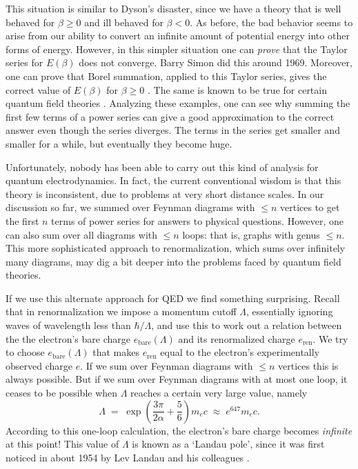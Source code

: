 \documentclass{article}
\newcommand{\bare}{\mathrm{bare}}
\newcommand{\ren}{\mathrm{ren}}
\begin{document}
This situation is similar to Dyson's disaster, since we have a theory that is well behaved for $\beta \ge 0$ and ill behaved for $\beta < 0$.  As before, the bad behavior seems to arise from our ability to convert an infinite amount of potential energy into other forms of energy.    However, in this simpler situation one can \emph{prove} that the Taylor series for $E(\beta)$ does not converge.  Barry Simon \cite{Simon1970} did this around 1969.  Moreover, one can prove that Borel summation, applied to this Taylor series, gives the correct value of $E(\beta)$ for $\beta \ge 0$ \cite{GGS}.  The same is known to be true for certain quantum field theories \cite{Rivasseau}.  Analyzing these examples, one can see why summing the first few terms of a power series can give a good approximation to the correct answer even though the series diverges.   The terms in the series get smaller and smaller for a while, but eventually they become huge.

Unfortunately, nobody has been able to carry out this kind of analysis for quantum electrodynamics.  In fact, the current conventional wisdom is that this theory is inconsistent, due to problems at very short distance scales.   In our discussion so far, we summed over Feynman diagrams with $\le n$ vertices to get the first $n$ terms of power series for answers to physical questions.  However, one can also sum over all diagrams with $\le n$ loops: that is, graphs with genus $\le n$.  This more sophisticated approach to renormalization, which sums over infinitely many diagrams, may dig a bit deeper into the problems faced by quantum field theories.   

If we use this alternate approach for QED we find something surprising.  Recall that
in renormalization we impose a momentum cutoff $\Lambda$, essentially ignoring waves of wavelength less than $\hbar/\Lambda$, and use this to work out a relation between the
the electron's bare charge $e_\bare(\Lambda)$ and its renormalized charge $e_\ren$.
We try to choose $e_\bare(\Lambda)$ that makes $e_\ren$ equal to the electron's experimentally observed charge $e$.   If we sum over Feynman diagrams with $\le n$ vertices this is always possible.  But if we sum over Feynman diagrams with at most one loop, it ceases to be possible when $\Lambda$ reaches a certain very large value, namely
\[     \Lambda \; = \; \exp\left(\frac{3 \pi}{2 \alpha} + \frac{5}{6}\right) m_e c \; \approx \; e^{647} m_e c. \] 
According to this one-loop calculation, the electron's bare charge becomes \emph{infinite} at this point!    This value of $\Lambda$ is known as a `Landau pole', since it was first noticed in about 1954 by Lev Landau and his colleagues \cite{Landau}.  
\end{document}

